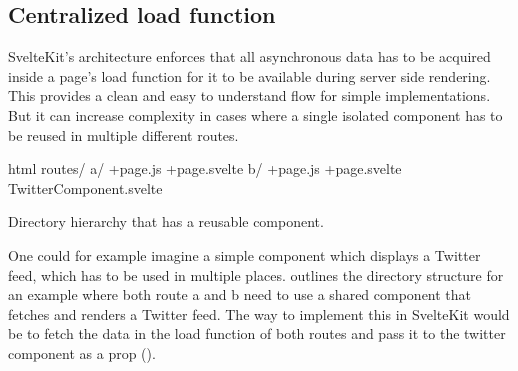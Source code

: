 

\subsection{Centralized load function}
SvelteKit's architecture enforces that all asynchronous data has to be acquired inside a page's load function for it to be available during server side rendering. This provides a clean and easy to understand flow for simple implementations. But it can increase complexity in cases where a single isolated component has to be reused in multiple different routes.

\begin{listing}[h]
\begin{myminted}{html}{}
routes/
  a/
    +page.js
    +page.svelte
  b/
    +page.js
    +page.svelte
  TwitterComponent.svelte
\end{myminted}
\caption{Directory hierarchy that has a reusable component.}
\label{fig:evaluation-reusable-file-hierarchy}
\end{listing}

One could for example imagine a simple component which displays a Twitter feed, which has to be used in multiple places.  outlines the directory structure for an example where both route a and b need to use a shared component that fetches and renders a Twitter feed. The way to implement this in SvelteKit would be to fetch the data in the load function of both routes and pass it to the twitter component as a prop ().


